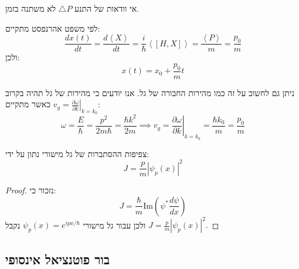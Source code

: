 \documentclass{tstextbook}
\begin{document}
\begin{corollary}
אי וודאות של התנע \(\triangle P\) לא משתנה בזמן.

\end{corollary}
\begin{proposition}
לפי משפט אהרנפסט מתקיים:
$$\frac{d x\left(t\right)}{d t}=\frac{d\left\langle X\right\rangle}{d t}=\frac{i}{\hbar}\left\langle\left[H,X\right]\right\rangle=\frac{\left\langle P\right\rangle}{m}=\frac{p_{0}}{m}$$
ולכן:
$$x\left(t\right)=x_{0}+{\frac{p_{0}}{m}}t$$

\end{proposition}
\begin{remark}
ניתן גם לחשוב על זה כמו מהירות החבורה של גל. אנו יודעים כי מהירות של גל תהיה בקרוב \(v_{g}=\left.\frac{\partial\omega}{\partial k}\right|_{k=k_{0}}\) כאשר מתקיים:
$$\omega={\frac{E}{\hbar}}={\frac{p^{2}}{2m\hbar}}={\frac{\hbar k^{2}}{2m}} \implies v_{g}=\left.{\frac{\partial\omega}{\partial k}}\right|_{k=k_{0}}={\frac{\hbar k_{0}}{m}}={\frac{p_{0}}{m}}$$

\end{remark}
\begin{proposition}
צפיפות ההסתברות של גל מישורי נתון על ידי:
$$J={\frac{p}{m}}|\psi_{p}(x)|^{2}$$

\end{proposition}
\begin{proof}
נזכור כי:
$$J={\frac{\hbar}{m}}\mathrm{Im}\left(\psi^{*}{\frac{d\psi}{d x}}\right)$$
ולכן עבור גל מישורי \(\psi_{p}(x)=e^{ ipx/\hbar }\) נקבל \(J={\frac{p}{m}}|\psi_{p}(x)|^{2}.\)

\end{proof}
\subsection{בור פוטנציאל אינסופי}
\end{document}
